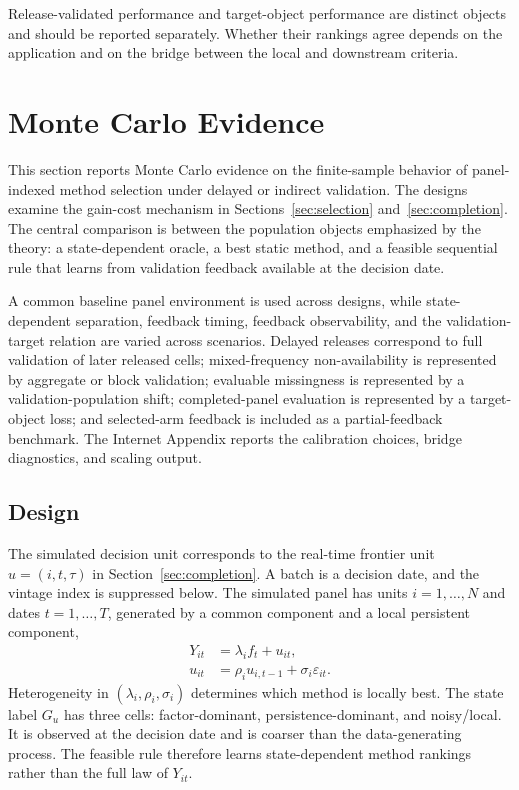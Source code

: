 \documentclass[a4paper, 12pt]{article}
\theoremstyle{plain}
\theoremstyle{remark}
\newcommand{\1}{\mathbf{1}}
\begin{document}
Release-validated performance and target-object performance are distinct objects and should be reported separately. Whether their rankings agree depends on the application and on the bridge between the local and downstream criteria.

\section{Monte Carlo Evidence}
\label{sec:montecarlo}

This section reports Monte Carlo evidence on the finite-sample behavior of panel-indexed method selection under delayed or indirect validation. The designs examine the gain-cost mechanism in Sections~\ref{sec:selection} and~\ref{sec:completion}. The central comparison is between the population objects emphasized by the theory: a state-dependent oracle, a best static method, and a feasible sequential rule that learns from validation feedback available at the decision date.

A common baseline panel environment is used across designs, while state-dependent separation, feedback timing, feedback observability, and the validation-target relation are varied across scenarios. Delayed releases correspond to full validation of later released cells; mixed-frequency non-availability is represented by aggregate or block validation; evaluable missingness is represented by a validation-population shift; completed-panel evaluation is represented by a target-object loss; and selected-arm feedback is included as a partial-feedback benchmark. The Internet Appendix reports the calibration choices, bridge diagnostics, and scaling output.

\subsection{Design}
\label{subsec:mc-design}
\enlargethispage{\baselineskip}

The simulated decision unit corresponds to the real-time frontier unit \(u=(i,t,\tau)\) in Section~\ref{sec:completion}. A batch is a decision date, and the vintage index is suppressed below. The simulated panel has units \(i=1,\ldots,N\) and dates \(t=1,\ldots,T\), generated by a common component and a local persistent component,
\begin{align*}
Y_{it} &= \lambda_i f_t + u_{it},\\
u_{it} &= \rho_i u_{i,t-1} + \sigma_i \varepsilon_{it}.
\end{align*}
Heterogeneity in \((\lambda_i,\rho_i,\sigma_i)\) determines which method is locally best. The state label \(G_u\) has three cells: factor-dominant, persistence-dominant, and noisy/local. It is observed at the decision date and is coarser than the data-generating process. The feasible rule therefore learns state-dependent method rankings rather than the full law of \(Y_{it}\).
\end{document}

